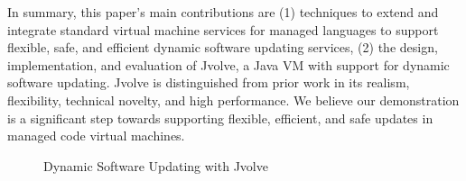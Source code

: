 \documentclass[9pt]{sigplanconf}
\newcommand{\DSU}{{\sc Jvolve}}
\begin{document}
In summary, this paper's main contributions are (1) techniques to extend and
integrate standard virtual machine services for managed languages to
support flexible, safe, and efficient dynamic software updating
services, (2) the design, implementation, and evaluation of \DSU, a
Java VM with support for dynamic software updating. \DSU{} is
distinguished from prior work in its realism, flexibility, technical
novelty, and high performance.  We believe our demonstration is a
significant step towards supporting flexible, efficient, and safe
updates in managed code virtual machines.



\begin{figure}[t]
\begin{center}
\end{center}
\caption{Dynamic Software Updating with \DSU}
\label{fig:overview}
\end{figure}


\end{document}
